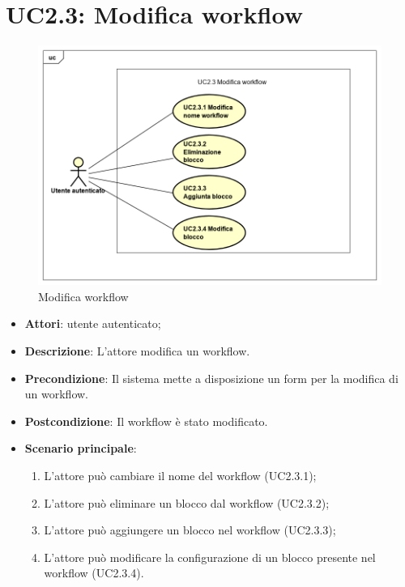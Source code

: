 \section{UC2.3: Modifica workflow}
\label{UC2.3}
\begin{figure} [h]
	\centering
	\includegraphics[scale=0.4]{./Diagram/UC2-3.png}
	\caption{Modifica workflow }\label{}
\end{figure}

\begin{itemize}
	\item \textbf{Attori}: utente autenticato;
	\item \textbf{Descrizione}: L'attore modifica un workflow.
	\item \textbf{Precondizione}: Il sistema mette a disposizione un form per la modifica di un workflow.
	\item \textbf{Postcondizione}: Il workflow è stato modificato.
	\item \textbf{Scenario principale}:
	\begin{enumerate} \item L'attore può cambiare il nome del workflow (UC2.3.1);  \item  L'attore può eliminare un blocco dal workflow (UC2.3.2);  \item 
		L'attore può aggiungere un blocco nel workflow (UC2.3.3);  \item  L'attore può modificare la configurazione di un blocco presente nel workflow (UC2.3.4).\end{enumerate}
\end{itemize}

